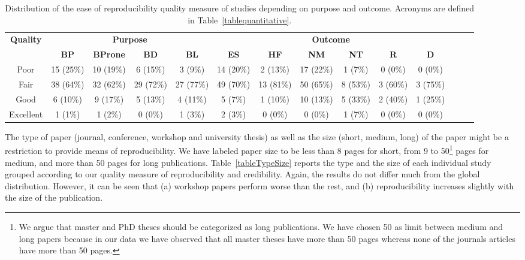 \documentclass[a4paper, 12pt]{book}
\begin{document}
\begin{table}[h!]
\caption{Distribution of the ease of reproducibility quality measure of studies depending on purpose and outcome. Acronyms are defined in Table~\ref{tablequantitative}.}
\label{tablequalitative&quantitative}
  \centering
  \begin{adjustbox}{max width=\textwidth}
  \begin{tabular}{|c|c|c|c|c||c|c|c|c|c|c|c|c|c|}
  \hline
\multicolumn{1}{|c|}{\bfseries Quality} & \multicolumn{4}{|c||}{\bfseries Purpose} & \multicolumn{6}{|c|}{\bfseries Outcome} \\
&\multicolumn{1}{|c|}{\bfseries BP}&\multicolumn{1}{|c|}{\bfseries BProne}&\multicolumn{1}{|c|}{\bfseries BD}&\multicolumn{1}{|c||}{\bfseries BL}&\multicolumn{1}{|c|}{\bfseries ES}&\multicolumn{1}{|c|}{\bfseries HF}&\multicolumn{1}{|c|}{\bfseries NM}&\multicolumn{1}{|c|}{\bfseries NT}&\multicolumn{1}{|c|}{\bfseries R}&\multicolumn{1}{|c|}{\bfseries D}\\
  \hline
  \hline
  Poor & 15 (25\%)&10 (19\%)&6 (15\%)&3 (9\%)&14 (20\%)&2 (13\%)&17 (22\%)&1 (7\%)&0 (0\%)&0 (0\%)\\
\hline
Fair &38 (64\%)&32 (62\%)&29 (72\%)&27 (77\%)&49 (70\%)&13 (81\%)&50 (65\%)&8 (53\%)&3 (60\%)&3 (75\%)\\
\hline
Good &6 (10\%)&9 (17\%)&5 (13\%)&4 (11\%)&5 (7\%)&1 (10\%)&10 (13\%)&5 (33\%)&2 (40\%)&1 (25\%)\\
\hline
Excellent &1 (1\%)&1 (2\%)&0 (0\%)&1 (3\%)&2 (3\%)&0 (0\%)&0 (0\%)&1 (7\%)&0 (0\%)&0 (0\%)\\
\hline
\end{tabular}
\end{adjustbox}
\end{table}

The type of paper (journal, conference, workshop and university thesis) as well as the size (short, medium, long) of the paper might be a restriction to provide means of reproducibility. 
We have labeled paper size to be less than 8 pages for short, from 9 to 50\footnote{We argue that master and PhD theses should be categorized as long publications. We have chosen 50 as limit between medium and long papers because in our data we have observed that all master theses have more than 50 pages whereas none of the journals articles have more than 50 pages.} pages for medium, and more than 50 pages for long publications. Table~\ref{tableTypeSize} reports the type and the size of each individual study grouped according to our quality measure of reproducibility and credibility.
Again, the results do not differ much from the global distribution. 
However, it can be seen that (a) workshop papers perform worse than the rest, and (b) reproducibility increases slightly with the size of the publication.
 
\end{document}
